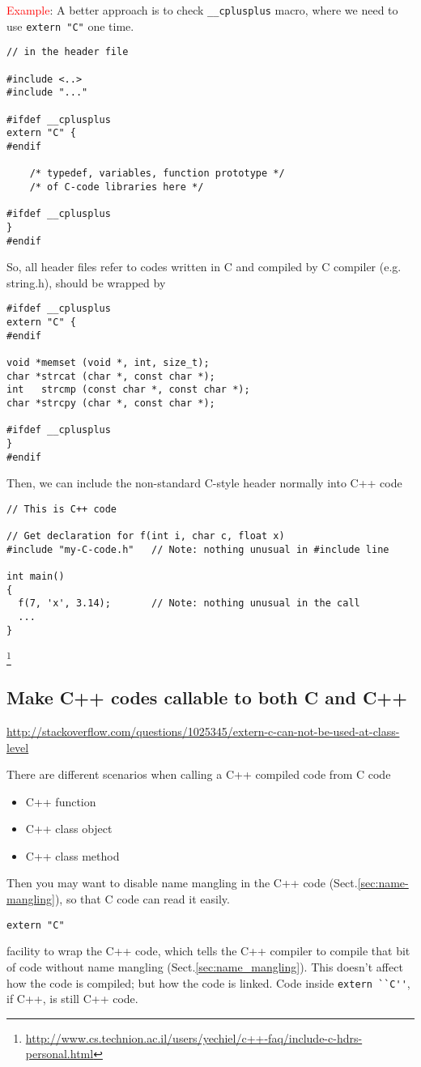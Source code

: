 \textcolor{red}{Example}: A better approach is to check \verb!__cplusplus!
macro, where we need to use \verb!extern "C"! one time.
\begin{lstlisting}
// in the header file

#include <..>
#include "..."

#ifdef __cplusplus 
extern "C" {
#endif

    /* typedef, variables, function prototype */
    /* of C-code libraries here */
    
#ifdef __cplusplus
}
#endif
\end{lstlisting}
So, all header files refer to codes written in C and compiled by C compiler
(e.g. string.h), should be wrapped by
\begin{lstlisting}
#ifdef __cplusplus
extern "C" {
#endif
 
void *memset (void *, int, size_t);
char *strcat (char *, const char *);
int   strcmp (const char *, const char *);
char *strcpy (char *, const char *);
 
#ifdef __cplusplus
}
#endif
\end{lstlisting}

Then, we can include the non-standard C-style header normally
into C++ code
\begin{verbatim}
// This is C++ code

// Get declaration for f(int i, char c, float x)
#include "my-C-code.h"   // Note: nothing unusual in #include line

int main()
{
  f(7, 'x', 3.14);       // Note: nothing unusual in the call
  ...
}
\end{verbatim}
\footnote{\url{http://www.cs.technion.ac.il/users/yechiel/c++-faq/include-c-hdrs-personal.html}}


\subsection{Make C++ codes callable to both C and C++ }
\label{sec:C++-code-callable-from-C-and-C++}

\url{http://stackoverflow.com/questions/1025345/extern-c-can-not-be-used-at-class-level}

There are different scenarios when calling a C++ compiled code from C code
\begin{itemize}
  \item C++ function
  \item C++ class object
  \item C++ class method
\end{itemize}
Then you may want to disable name mangling in the C++ code
(Sect.\ref{sec:name-mangling}), so that C code can read it easily. 
\begin{verbatim}
extern "C"
\end{verbatim}
facility to wrap the C++ code, which tells the C++ compiler to compile that bit
of code without name mangling (Sect.\ref{sec:name_mangling}). 
This doesn't affect how the code is compiled; but how the code is linked. Code
inside \verb!extern ``C''!, if C++, is still C++ code. 


